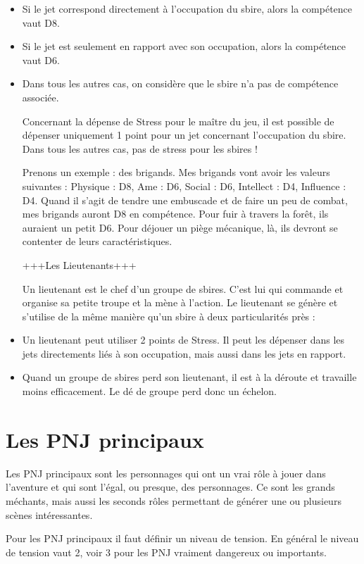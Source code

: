 \documentclass{conf/FusinaClass}
\begin{document}
\begin{itemize}
\item Si le jet correspond directement à l'occupation du sbire, alors la compétence vaut D8.
\item Si le jet est seulement en rapport avec son occupation, alors la compétence vaut D6.
\item Dans tous les autres cas, on considère que le sbire n'a pas de compétence associée.

Concernant la dépense de Stress pour le maître du jeu, il est possible de dépenser uniquement 1 point pour un jet concernant l'occupation du sbire. Dans tous les autres cas, pas de stress pour les sbires ! 

Prenons un exemple : des brigands. Mes brigands vont avoir les valeurs suivantes : Physique : D8, Ame : D6, Social : D6, Intellect : D4, Influence : D4. Quand il s'agit de tendre une embuscade et de faire un peu de combat, mes brigands auront D8 en compétence. Pour fuir à travers la forêt, ils auraient un petit D6. Pour déjouer un piège mécanique, là, ils devront se contenter de leurs caractéristiques.

+++Les Lieutenants+++

Un lieutenant est le chef d'un groupe de sbires. C'est lui qui commande et organise sa petite troupe et la mène à l'action. Le lieutenant se génère et s'utilise de la même manière qu'un sbire à deux particularités près :

\item Un lieutenant peut utiliser 2 points de Stress. Il peut les dépenser dans les jets directements liés à son occupation, mais aussi dans les jets en rapport.
\item Quand un groupe de sbires perd son lieutenant, il est à la déroute et travaille moins efficacement. Le dé de groupe perd donc un échelon.
\end{itemize}

\section{Les PNJ principaux}
Les PNJ principaux sont les personnages qui ont un vrai rôle à jouer dans l'aventure et qui sont l'égal, ou presque, des personnages. Ce sont les grands méchants, mais aussi les seconds rôles permettant de générer une ou plusieurs scènes intéressantes.

Pour les PNJ principaux il faut définir un niveau de tension. En général le niveau de tension vaut 2, voir 3 pour les PNJ vraiment dangereux ou importants. 
\end{document}
